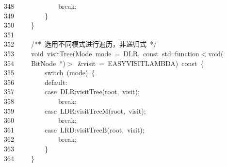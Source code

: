 \documentclass[11pt,a4paper]{ctexart}
\newcommand{\hlstd}[1]{\textcolor[rgb]{0.2,0.2,0.2}{#1}}
\newcommand{\hlcom}[1]{\textcolor[rgb]{0.59,0.59,0.59}{#1}}
\newcommand{\hlopt}[1]{\textcolor[rgb]{0.2,0.2,0.2}{#1}}
\newcommand{\hllin}[1]{\textcolor[rgb]{0.59,0.59,0.59}{#1}}
\newcommand{\hlkwa}[1]{\textcolor[rgb]{0.23,0.42,0.78}{#1}}
\newcommand{\hlkwb}[1]{\textcolor[rgb]{0.63,0,0.31}{#1}}
\newcommand{\hlkwc}[1]{\textcolor[rgb]{0,0.63,0.31}{#1}}
\newcommand{\hlkwd}[1]{\textcolor[rgb]{0.78,0.23,0.41}{#1}}
\begin{document}
\hllin{348\ }\hlstd{}\hlstd{\ \ \ \ \ \ \ \ \ \ \ \ }\hlstd{}\hlkwa{break}\hlstd{}\hlopt{;}\\
\hllin{349\ }\hlstd{}\hlstd{\ \ \ \ \ \ \ \ }\hlstd{}\hlopt{\}}\\
\hllin{350\ }\hlstd{}\hlstd{\ \ \ \ }\hlstd{}\hlopt{\}}\\
\hllin{351\ }\hlstd{}\\
\hllin{352\ }\hlstd{}\hlstd{\ \ \ \ }\hlstd{}\hlcom{/{*}{*}\ 选用不同模式进行遍历，非递归式\ {*}/}\hlstd{}\\
\hllin{353\ }\hlstd{}\hlstd{\ \ \ \ }\hlstd{}\hlkwb{void\ }\hlstd{}\hlkwd{visitTree}\hlstd{}\hlopt{(}\hlstd{Mode\ mode\ }\hlopt{=\ }\hlstd{DLR}\hlopt{,\ }\hlstd{}\hlkwb{const\ }\hlstd{}\hlkwc{std}\hlstd{}\hlopt{::}\hlstd{function}\hlopt{$<$}\hlstd{}\hlkwb{void}\hlstd{}\hlopt{(}\Righttorque\\
\hllin{354\ }\hlstd{}\hlstd{\ \ \ \ }\hlstd{BitNode\ }\hlopt{{*})$>$\ \&}\hlstd{visit\ }\hlopt{=\ }\hlstd{EASY\textunderscore VISIT\textunderscore LAMBDA}\hlopt{)\ }\hlstd{}\hlkwb{const\ }\hlstd{}\hlopt{\{}\\
\hllin{355\ }\hlstd{}\hlstd{\ \ \ \ \ \ \ \ }\hlstd{}\hlkwa{switch\ }\hlstd{}\hlopt{(}\hlstd{mode}\hlopt{)\ \{}\\
\hllin{356\ }\hlstd{}\hlstd{\ \ \ \ \ \ \ \ }\hlstd{}\hlkwa{default}\hlstd{}\hlopt{:}\\
\hllin{357\ }\hlstd{}\hlstd{\ \ \ \ \ \ \ \ }\hlstd{}\hlkwa{case\ }\hlstd{DLR}\hlopt{:}\hlstd{}\hlkwd{visitTree}\hlstd{}\hlopt{(}\hlstd{root}\hlopt{,\ }\hlstd{visit}\hlopt{);}\\
\hllin{358\ }\hlstd{}\hlstd{\ \ \ \ \ \ \ \ \ \ \ \ }\hlstd{}\hlkwa{break}\hlstd{}\hlopt{;}\\
\hllin{359\ }\hlstd{}\hlstd{\ \ \ \ \ \ \ \ }\hlstd{}\hlkwa{case\ }\hlstd{LDR}\hlopt{:}\hlstd{}\hlkwd{visitTreeM}\hlstd{}\hlopt{(}\hlstd{root}\hlopt{,\ }\hlstd{visit}\hlopt{);}\\
\hllin{360\ }\hlstd{}\hlstd{\ \ \ \ \ \ \ \ \ \ \ \ }\hlstd{}\hlkwa{break}\hlstd{}\hlopt{;}\\
\hllin{361\ }\hlstd{}\hlstd{\ \ \ \ \ \ \ \ }\hlstd{}\hlkwa{case\ }\hlstd{LRD}\hlopt{:}\hlstd{}\hlkwd{visitTreeB}\hlstd{}\hlopt{(}\hlstd{root}\hlopt{,\ }\hlstd{visit}\hlopt{);}\\
\hllin{362\ }\hlstd{}\hlstd{\ \ \ \ \ \ \ \ \ \ \ \ }\hlstd{}\hlkwa{break}\hlstd{}\hlopt{;}\\
\hllin{363\ }\hlstd{}\hlstd{\ \ \ \ \ \ \ \ }\hlstd{}\hlopt{\}}\\
\hllin{364\ }\hlstd{}\hlstd{\ \ \ \ }\hlstd{}\hlopt{\}}\\
\end{document}
